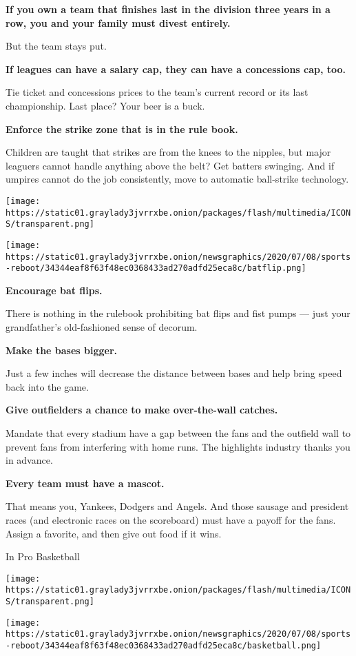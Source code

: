 \textbf{If you own a team that finishes last in the division three years
in a row, you and your family must divest entirely.}

But the team stays put.

\textbf{If leagues can have a salary cap, they can have a concessions
cap, too.}

Tie ticket and concessions prices to the team's current record or its
last championship. Last place? Your beer is a buck.

\textbf{Enforce the strike zone that is in the rule book.}

Children are taught that strikes are from the knees to the nipples, but
major leaguers cannot handle anything above the belt? Get batters
swinging. And if umpires cannot do the job consistently, move to
automatic ball-strike technology.

\texttt{[image: https://static01.graylady3jvrrxbe.onion/packages/flash/multimedia/ICONS/transparent.png]}

\texttt{[image: https://static01.graylady3jvrrxbe.onion/newsgraphics/2020/07/08/sports-reboot/34344eaf8f63f48ec0368433ad270adfd25eca8c/batflip.png]}

\textbf{Encourage bat flips.}

There is nothing in the rulebook prohibiting bat flips and fist pumps
--- just your grandfather's old-fashioned sense of decorum.

\textbf{Make the bases bigger.}

Just a few inches will decrease the distance between bases and help
bring speed back into the game.

\textbf{Give outfielders a chance to make over-the-wall catches.}

Mandate that every stadium have a gap between the fans and the outfield
wall to prevent fans from interfering with home runs. The highlights
industry thanks you in advance.

\textbf{Every team must have a mascot.}

That means you, Yankees, Dodgers and Angels. And those sausage and
president races (and electronic races on the scoreboard) must have a
payoff for the fans. Assign a favorite, and then give out food if it
wins.

In Pro Basketball

\texttt{[image: https://static01.graylady3jvrrxbe.onion/packages/flash/multimedia/ICONS/transparent.png]}

\texttt{[image: https://static01.graylady3jvrrxbe.onion/newsgraphics/2020/07/08/sports-reboot/34344eaf8f63f48ec0368433ad270adfd25eca8c/basketball.png]}

